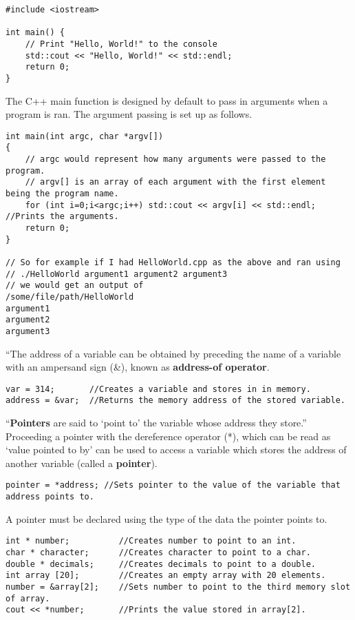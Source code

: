 \begin{lstlisting}
#include <iostream>

int main() {
    // Print "Hello, World!" to the console
    std::cout << "Hello, World!" << std::endl;
    return 0;
}
\end{lstlisting}

The C++ main function is designed by default to pass in arguments when a program is ran. The argument passing is set up as follows.
\begin{lstlisting}
int main(int argc, char *argv[])
{
	// argc would represent how many arguments were passed to the program.
	// argv[] is an array of each argument with the first element being the program name.
	for (int i=0;i<argc;i++) std::cout << argv[i] << std::endl; //Prints the arguments.
	return 0;
}

// So for example if I had HelloWorld.cpp as the above and ran using
// ./HelloWorld argument1 argument2 argument3
// we would get an output of 
/some/file/path/HelloWorld
argument1
argument2
argument3
\end{lstlisting}

``The address of a variable can be obtained by preceding the name of a variable with an ampersand sign (\&), known as \textbf{address-of operator}. \cite{cpp:pointers}
\begin{lstlisting}
var = 314;       //Creates a variable and stores in in memory.
address = &var;  //Returns the memory address of the stored variable.
\end{lstlisting}

``\textbf{Pointers} are said to `point to' the variable whose address they store.'' \cite{cpp:pointers} Proceeding a pointer with the dereference operator (*), which can be read as `value pointed to by' can be used to access a variable which stores the address of another variable (called a \textbf{pointer}).
\begin{lstlisting}
pointer = *address; //Sets pointer to the value of the variable that address points to.
\end{lstlisting}

A pointer must be declared using the type of the data the pointer points to.
\begin{lstlisting}
int * number;          //Creates number to point to an int.
char * character;      //Creates character to point to a char.
double * decimals;     //Creates decimals to point to a double.
int array [20];        //Creates an empty array with 20 elements.
number = &array[2];    //Sets number to point to the third memory slot of array.
cout << *number;       //Prints the value stored in array[2].
\end{lstlisting}

